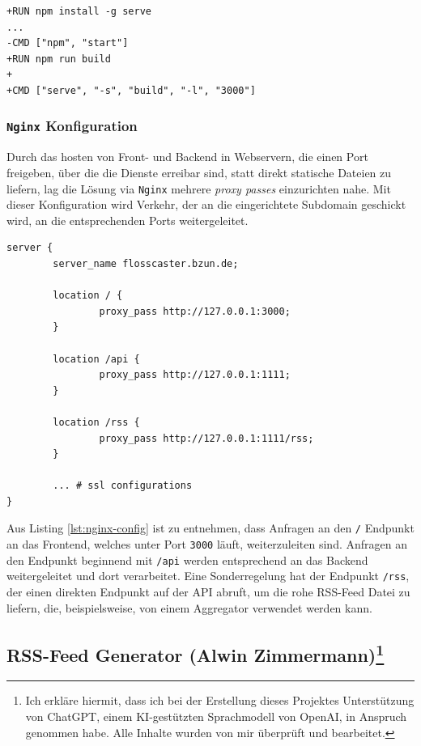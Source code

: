 \documentclass{article}
\begin{document}
\begin{lstlisting}[caption=Unterschiede im Frontend Dockerfile]
+RUN npm install -g serve
...
-CMD ["npm", "start"]
+RUN npm run build
+
+CMD ["serve", "-s", "build", "-l", "3000"]
\end{lstlisting}

\subsubsection{\texttt{Nginx} Konfiguration}
Durch das hosten von Front- und Backend in Webservern, die einen Port freigeben, über die die Dienste erreibar sind, statt direkt statische Dateien zu liefern, lag die Lösung via \texttt{Nginx} mehrere \textit{proxy passes} einzurichten nahe. Mit dieser Konfiguration wird Verkehr, der an die eingerichtete Subdomain geschickt wird, an die entsprechenden Ports weitergeleitet.

\begin{lstlisting}[label=lst:nginx-config, caption=\texttt{Nginx} \textit{proxy pass} Konfiguration]
server {
        server_name flosscaster.bzun.de;

        location / {
                proxy_pass http://127.0.0.1:3000;
        }

        location /api {
                proxy_pass http://127.0.0.1:1111;
        }

        location /rss {
                proxy_pass http://127.0.0.1:1111/rss;
        }

        ... # ssl configurations
}
\end{lstlisting}

Aus Listing \ref{lst:nginx-config} ist zu entnehmen, dass Anfragen an den \texttt{/} Endpunkt an das Frontend, welches unter Port \texttt{3000} läuft, weiterzuleiten sind. Anfragen an den Endpunkt beginnend mit \texttt{/api} werden entsprechend an das Backend weitergeleitet und dort verarbeitet. Eine Sonderregelung hat der Endpunkt \texttt{/rss}, der einen direkten Endpunkt auf der API abruft, um die rohe RSS-Feed Datei zu liefern, die, beispielsweise, von einem Aggregator verwendet werden kann. 


\subsection[RSS-Feed Generator \small{(Alwin Zimmermann)}]{RSS-Feed Generator \small{(Alwin Zimmermann)\footnote{Ich erkläre hiermit, dass ich bei der Erstellung dieses Projektes Unterstützung von ChatGPT, einem KI-gestützten Sprachmodell von OpenAI, in Anspruch genommen habe. Alle Inhalte wurden von mir überprüft und bearbeitet.}}}
\end{document}

